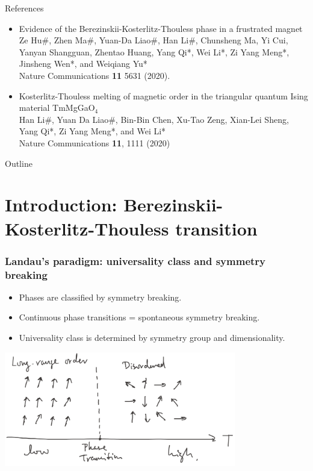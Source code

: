 \documentclass[xcolor=table, aspectratio=1610,ignorenonframetext]{beamer}
\begin{document}
\begin{frame}{References}
\begin{itemize}
	\item Evidence of the Berezinskii-Kosterlitz-Thouless phase in a frustrated magnet\\
Ze Hu\#, Zhen Ma\#, Yuan-Da Liao\#, Han Li\#, Chunsheng Ma, Yi Cui, Yanyan Shangguan, Zhentao Huang, Yang Qi*, Wei Li*, Zi Yang Meng*, Jinsheng Wen*, and Weiqiang Yu*\\
Nature Communications \textbf{11} 5631 (2020).
	\item Kosterlitz-Thouless melting of magnetic order in the triangular quantum Ising material TmMgGaO${}_4$\\
Han Li\#, Yuan Da Liao\#, Bin-Bin Chen, Xu-Tao Zeng, Xian-Lei Sheng, Yang Qi*, Zi Yang Meng*, and Wei Li*\\
Nature Communications \textbf{11}, 1111 (2020)
\end{itemize}
\end{frame}

\begin{frame}{Outline}
		\tableofcontents
\end{frame}

\section{Introduction: Berezinskii-Kosterlitz-Thouless transition}

\begin{frame}
  \frametitle{Landau's paradigm: universality class and symmetry breaking}
  \begin{itemize}
  \item Phases are classified by symmetry breaking.
  \item Continuous phase transitions = spontaneous symmetry breaking.
  \item Universality class is determined by symmetry group and dimensionality.
  \end{itemize}
  \begin{center}
    \includegraphics[height=5cm]{landau-paradigm}
  \end{center}
\end{frame}
\end{document}
